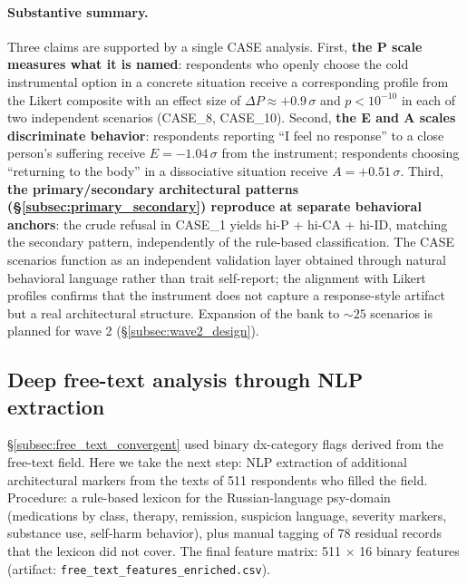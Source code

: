 \paragraph{Substantive summary.} Three claims are supported by a single CASE analysis. First, \textbf{the P scale measures what it is named}: respondents who openly choose the cold instrumental option in a concrete situation receive a corresponding profile from the Likert composite with an effect size of $\Delta P \approx +0.9\,\sigma$ and $p < 10^{-10}$ in each of two independent scenarios (CASE\_8, CASE\_10). Second, \textbf{the E and A scales discriminate behavior}: respondents reporting ``I feel no response'' to a close person's suffering receive $E = -1.04\,\sigma$ from the instrument; respondents choosing ``returning to the body'' in a dissociative situation receive $A = +0.51\,\sigma$. Third, \textbf{the primary/secondary architectural patterns (§\ref{subsec:primary_secondary}) reproduce at separate behavioral anchors}: the crude refusal in CASE\_1 yields hi-P + hi-CA + hi-ID, matching the secondary pattern, independently of the rule-based classification. The CASE scenarios function as an independent validation layer obtained through natural behavioral language rather than trait self-report; the alignment with Likert profiles confirms that the instrument does not capture a response-style artifact but a real architectural structure. Expansion of the bank to $\sim 25$ scenarios is planned for wave 2 (§\ref{subsec:wave2_design}).

\subsection{Deep free-text analysis through NLP extraction}
\label{subsec:free_text_nlp}

§\ref{subsec:free_text_convergent} used binary dx-category flags derived from the free-text field. Here we take the next step: NLP extraction of additional architectural markers from the texts of 511 respondents who filled the field. Procedure: a rule-based lexicon for the Russian-language psy-domain (medications by class, therapy, remission, suspicion language, severity markers, substance use, self-harm behavior), plus manual tagging of 78 residual records that the lexicon did not cover. The final feature matrix: 511 × 16 binary features (artifact: \texttt{free\_text\_features\_enriched.csv}).

